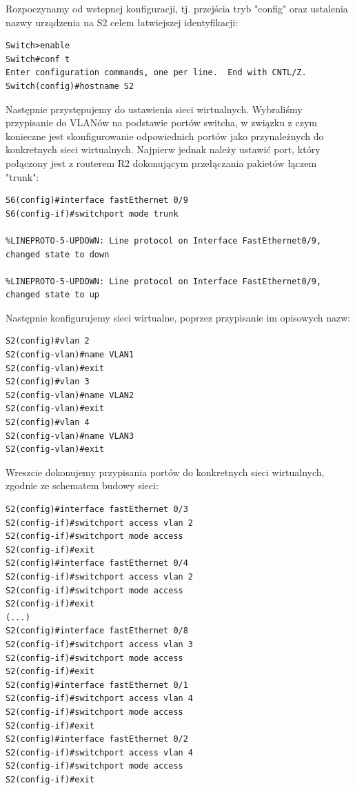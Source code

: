 \documentclass[polish,11pt,a4paper,twoside]{article}
\begin{document}
Rozpoczynamy od wstepnej konfiguracji, tj. przejścia tryb "config" oraz ustalenia nazwy urządzenia na S2 celem łatwiejszej identyfikacji:
\begin{lstlisting}
Switch>enable
Switch#conf t
Enter configuration commands, one per line.  End with CNTL/Z.
Switch(config)#hostname S2
\end{lstlisting}
Następnie przystępujemy do ustawienia sieci wirtualnych. Wybraliśmy przypisanie do VLANów na podstawie portów switcha, w związku z czym konieczne jest skonfigurowanie odpowiednich portów jako przynależnych do konkretnych sieci wirtualnych. Najpierw jednak należy ustawić port, który połączony jest z routerem R2 dokonującym przełączania pakietów łączem "trunk":
\begin{lstlisting}
S6(config)#interface fastEthernet 0/9
S6(config-if)#switchport mode trunk 

%LINEPROTO-5-UPDOWN: Line protocol on Interface FastEthernet0/9, changed state to down

%LINEPROTO-5-UPDOWN: Line protocol on Interface FastEthernet0/9, changed state to up
\end{lstlisting}
Następnie konfigurujemy sieci wirtualne, poprzez przypisanie im opisowych nazw:
\begin{lstlisting}
S2(config)#vlan 2
S2(config-vlan)#name VLAN1
S2(config-vlan)#exit
S2(config)#vlan 3
S2(config-vlan)#name VLAN2
S2(config-vlan)#exit
S2(config)#vlan 4
S2(config-vlan)#name VLAN3
S2(config-vlan)#exit
\end{lstlisting}
Wreszcie dokonujemy przypisania portów do konkretnych sieci wirtualnych, zgodnie ze schematem budowy sieci:
\begin{lstlisting}
S2(config)#interface fastEthernet 0/3
S2(config-if)#switchport access vlan 2
S2(config-if)#switchport mode access 
S2(config-if)#exit
S2(config)#interface fastEthernet 0/4
S2(config-if)#switchport access vlan 2
S2(config-if)#switchport mode access 
S2(config-if)#exit
(...)
S2(config)#interface fastEthernet 0/8
S2(config-if)#switchport access vlan 3
S2(config-if)#switchport mode access 
S2(config-if)#exit
S2(config)#interface fastEthernet 0/1
S2(config-if)#switchport access vlan 4
S2(config-if)#switchport mode access 
S2(config-if)#exit
S2(config)#interface fastEthernet 0/2
S2(config-if)#switchport access vlan 4
S2(config-if)#switchport mode access 
S2(config-if)#exit
\end{lstlisting}
\end{document}
